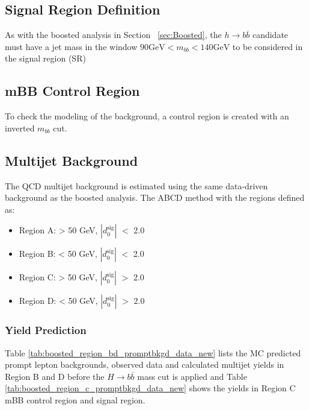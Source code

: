 \subsection{Signal Region Definition}
As with the boosted analysis in Section ~\ref{sec:Boosted}, the ${h\rightarrow b\overline{b}}$ candidate must have a jet mass in the window ${90 \mathrm{ GeV } < m_{bb} < 140 \mathrm{GeV}}$ to be considered in the signal region (SR)
\subsection{mBB Control Region}
To check the modeling of the background, a control region is created with an inverted ${m_{bb}}$ cut. 
\subsection{Multijet Background}
The QCD multijet background is estimated using the same data-driven background as the boosted analysis. The ABCD method with the regions defined as:
\begin{itemize}
\item Region A: \met > 50 GeV, $|d_{0}^{\textrm{sig}}|$ $<$ 2.0
\item Region B: \met < 50 GeV, $|d_{0}^{\textrm{sig}}|$ $<$ 2.0
\item Region C: \met > 50 GeV, $|d_{0}^{\textrm{sig}}|$ $>$ 2.0
\item Region D: \met < 50 GeV, $|d_{0}^{\textrm{sig}}|$ $>$ 2.0
\end{itemize}

\subsubsection{Yield Prediction}
Table \ref{tab:boosted_region_bd_promptbkgd_data_new} lists the MC predicted prompt lepton backgrounds, observed data and calculated multijet yields in Region B and D before the ${H\rightarrow b\overline{b}}$ mass cut is applied and Table \ref{tab:boosted_region_c_promptbkgd_data_new} shows the yields in Region C mBB control region and signal region.\newline

